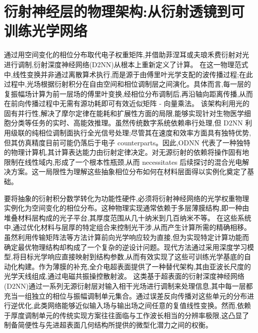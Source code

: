 \section{衍射神经层的物理架构:从衍射透镜到可训练光学网络}\label{ux884dux5c04ux795eux7ecfux5c42ux7684ux7269ux7406ux67b6ux6784ux4eceux884dux5c04ux900fux955cux5230ux53efux8badux7ec3ux5149ux5b66ux7f51ux7edc}

通过用空间变化的相位分布取代电子权重矩阵,并借助菲涅耳或夫琅禾费衍射对光进行调制,衍射深度神经网络(D2NN)从根本上重新定义了计算。\citep{doi_10_1126_science_aat8084_e055772d} \citep{doi_10_1117_12_2675468_10b5d458} 在这一物理范式中,线性变换并非通过离散算术执行,而是源于由傅里叶光学支配的波传播过程;在此过程中,光场根据衍射积分在自由空间和相位调制层之间演化。具体而言,每一层的复振幅场计算为前一层场的傅里叶变换,经相位分布调制后,再沿轴向距离传播,从而在前向传播过程中无需有源功耗即可有效近似矩阵 - 向量乘法。\citep{doi_10_1117_1_apn_5_1_016005_dfabad74} 该架构利用光的固有并行性,解决了摩尔定律在能耗和扩展性方面的局限,能够实现针对生物医学细胞分类等任务的实时、高能效推理。虽然传统数字系统依赖串行处理,但 D2NN 利用级联的纯相位调制面执行全光信号处理;尽管其在速度和效率方面具有独特优势,但其仿真精度目前可能仍落后于电子 counterparts。因此,ODNN 代表了一种独特的物理计算机,其计算表达能力由衍射定律决定。对无源衍射的依赖将操作固有地限制在线性域内,形成了一个根本性瓶颈,从而 necessitates 后续探讨的混合光电解决方案。这一局限性为理解这些抽象相位分布如何在材料层面得以实例化奠定了基础。\citep{doi_10_1364_ol_593231_ab93febc} \citep{s2_f7b7631268f17b1f868015df0bd08ef57904024d_011f3a59} \citep{doi_10_1063_5_0323145_de1041b1} \citep{doi_10_1109_twc_2025_3632886_01858e99} \citep{doi_10_3390_life13051148_9434b5b6} \citep{doi_10_1364_ol_428761_f1f67ac8} \citep{doi_10_1002_lpor_202200348_d54cae18}

要将抽象的衍射积分数学转化为功能性硬件,必须将衍射神经网络的光学权重物理实例化为空间变化的相位分布。这种物理实现通常依赖于多层薄膜结构,即一种由堆叠材料层构成的光子平台,其厚度范围从几十纳米到几百纳米不等。\citep{doi_10_1039_d5nh00367a_1be9a889} \citep{doi_10_1002_smtd_202400087_8e52a90c} 在这些系统中,通过优化材料与层厚的特定组合来控制光干涉,从而产生计算所需的精确相移。虽然利用传输矩阵法等方法计算前向光学响应较为直接,但为实现特定计算功能而确定最优物理结构却构成了一个复杂的逆设计问题。现代方法通过采用深度学习模型,将目标光学响应直接映射到结构参数,从而有效实现了这些可训练光学基底的自动化构建。作为薄膜的补充,全介电超表面提供了一种替代架构,其由亚波长尺度的光学天线组成,通过电磁共振操控散射波。\citep{doi_10_1088_1612_202x_ab2121_c375efca} \citep{doi_10_1109_mac64480_2025_11140514_7f08c073} 这类基于超表面的衍射深度神经网络(D2NN)通过一系列无源衍射层对输入相干光场进行调制来处理信息,其中每一层都充当一组独立的相位与振幅调制单元集合。通过误差反向传播对这些单元的分布进行逆优化,此类网络能够近似输入场与输出场之间任意的复值线性变换。然而,依赖于厚度调制单元的传统实现方案往往面临与工作波长相当的分辨率极限,这凸显了制备简便性与先进超表面几何结构所提供的微型化潜力之间的权衡。\citep{doi_10_1016_j_isci_2025_112222_1f7c10f5} \citep{doi_10_1515_nanoph_2023_0760_2c3ec088}

